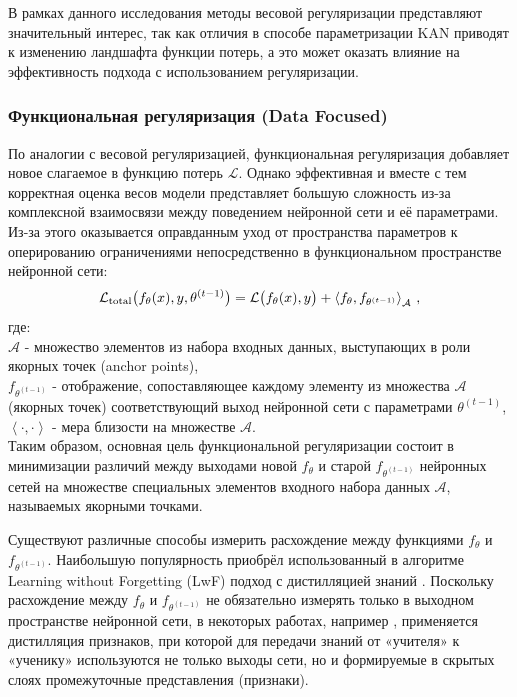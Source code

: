 \documentclass[a4paper,14pt]{extarticle}
\begin{document}
В рамках данного исследования методы весовой регуляризации представляют
значительный интерес, так как отличия в способе параметризации KAN приводят к
изменению ландшафта функции потерь, а это может оказать влияние на эффективность
подхода с использованием регуляризации.

\subsubsection{Функциональная регуляризация (Data Focused)}
По аналогии с весовой регуляризацией, функциональная регуляризация добавляет
новое слагаемое в функцию потерь \(\mathcal{L}\). Однако эффективная и вместе с тем корректная
оценка весов модели представляет большую сложность из-за комплексной взаимосвязи
между поведением нейронной сети и её параметрами. Из-за этого оказывается
оправданным уход от пространства параметров к оперированию ограничениями
непосредственно в функциональном пространстве нейронной сети:
\begin{equation}
    \mathcal{L}_{\mathrm{total}}\bigl(f_\theta(x),y,\theta^{(t-1)}\bigr)\\
    =\mathcal{L}\bigl(f_\theta(x),y\bigr)\\
    +\left\langle f_\theta,f_{\theta^{(t-1)}}\right\rangle_{\mathcal{A}}\,,
\end{equation}
где:\\
\(\mathcal{A}\) - множество элементов из набора входных данных, выступающих в
роли якорных точек (anchor points),\\
\(f_{\theta^{(t-1)}}\) - отображение, сопоставляющее каждому элементу из множества
\(\mathcal{A}\) (якорных точек) соответствующий выход нейронной сети с
параметрами \(\theta^{(t-1)}\),\\ 
\(\left\langle\cdot,\cdot\right\rangle\) - мера близости на множестве
\(\mathcal{A}\).\\
Таким образом, основная цель функциональной регуляризации состоит в минимизации
различий между выходами новой \(f_\theta\) и старой \(f_{\theta^{(t-1)}}\)
нейронных сетей на множестве специальных элементов входного набора данных 
\(\mathcal{A}\), называемых якорными точками.

Существуют различные способы измерить расхождение между функциями \(f_\theta\) и
\(f_{\theta^{(t-1)}}\). Наибольшую популярность приобрёл использованный в
алгоритме Learning without Forgetting (LwF) \cite{li2016learning} подход с
дистилляцией знаний \cite{hinton2015distilling}. Поскольку расхождение между
\(f_\theta\) и \(f_{\theta^{(t-1)}}\) не обязательно измерять только в выходном
пространстве нейронной сети, в некоторых работах, например
\cite{roy2023subspace}, применяется дистилляция признаков, при которой для
передачи знаний от «учителя» к «ученику» используются не только выходы сети, но
и формируемые в скрытых слоях промежуточные представления (признаки).
\end{document}
